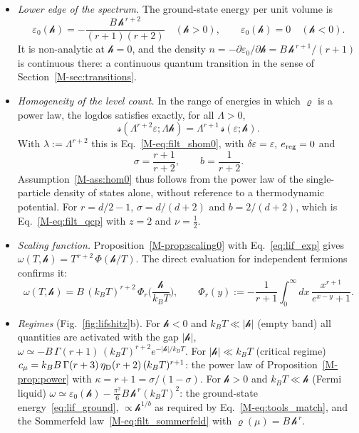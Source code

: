 \documentclass[10pt,a4paper]{article}
\theoremstyle{plain}
\theoremstyle{remark}
\newcommand{\lndos}{{logdos}}  %
\newcommand{\hfield}{\mathscr{h}}  %
\newcommand{\lds}{\mathscr{s}}  %
\newcommand{\etaD}{\eta_{\rm D}}  %
\begin{document}
\begin{itemize}\setlength{\itemsep}{0pt}
\item \emph{Lower edge of the spectrum.} The ground-state energy per unit
  volume is
  \begin{equation}\label{eq:lif_ground}
    \varepsilon_0(\hfield)=-\frac{B\,\hfield^{\,r+2}}{(r+1)(r+2)}\quad(\hfield>0) ,
    \qquad
    \varepsilon_0(\hfield)=0\quad(\hfield<0) .
  \end{equation}
  It is non-analytic at $\hfield=0$, and the density
  $n=-\partial\varepsilon_0/\partial\hfield=B\,\hfield^{\,r+1}/(r+1)$ is
  continuous there: a continuous quantum transition in the sense of
  Section~\ref{M-sec:transitions}.
\item \emph{Homogeneity of the level count.} In the range of energies in
  which $\varrho$ is a power law, the \lndos{} satisfies exactly, for all
  $\Lambda>0$,
  \begin{equation}\label{eq:lif_hom}
    \lds(\Lambda^{r+2}\varepsilon;\Lambda\hfield)=\Lambda^{r+1}\,\lds(\varepsilon;\hfield) .
  \end{equation}
  With $\lambda:=\Lambda^{r+2}$ this is Eq.~\eqref{M-eq:filt_shom0}, with
  $\delta\varepsilon=\varepsilon$, $e_{\rm reg}=0$ and
  \begin{equation}\label{eq:lif_exp}
    \sigma=\frac{r+1}{r+2} ,\qquad b=\frac{1}{r+2} .
  \end{equation}
  Assumption~\ref{M-ass:hom0} thus follows from the power law of the
  single-particle density of states alone, without reference to a
  thermodynamic potential. For $r=d/2-1$, $\sigma=d/(d+2)$ and $b=2/(d+2)$,
  which is Eq.~\eqref{M-eq:filt_qcp} with $z=2$ and $\nu=\tfrac12$.
\item \emph{Scaling function.} Proposition~\ref{M-prop:scaling0} with
  Eq.~\eqref{eq:lif_exp} gives
  $\omega(T,\hfield)=T^{\,r+2}\,\Phi(\hfield/T)$. The direct evaluation for
  independent fermions confirms it:
  \begin{equation}\label{eq:lif_omega}
    \omega(T,\hfield)=B\,(k_BT)^{r+2}\,\Phi_r\Big(\frac{\hfield}{k_BT}\Big) ,
    \qquad
    \Phi_r(y):=-\frac{1}{r+1}\int_0^{\infty}dx\,\frac{x^{r+1}}{e^{x-y}+1} .
  \end{equation}
\item \emph{Regimes} (Fig.~\ref{fig:lifshitz}b). For $\hfield<0$ and
  $k_BT\ll|\hfield|$ (empty band) all quantities are activated with the gap
  $|\hfield|$, $\omega\simeq-B\,\Gamma(r+1)\,(k_BT)^{r+2}e^{-|\hfield|/k_BT}$.
  For $|\hfield|\ll k_BT$ (critical regime)
  $c_\mu=k_BB\,\Gamma(r+3)\,\etaD(r+2)\,(k_BT)^{r+1}$: the power law of
  Proposition~\ref{M-prop:power} with $\kappa=r+1=\sigma/(1-\sigma)$. For
  $\hfield>0$ and $k_BT\ll\hfield$ (Fermi liquid)
  $\omega\simeq\varepsilon_0(\hfield)-\tfrac{\pi^{2}}{6}B\,\hfield^{\,r}(k_BT)^{2}$:
  the ground-state energy~\eqref{eq:lif_ground}, $\propto\hfield^{1/b}$ as
  required by Eq.~\eqref{M-eq:tools_match}, and the Sommerfeld
  law~\eqref{M-eq:filt_sommerfeld} with $\varrho(\mu)=B\,\hfield^{\,r}$.
\end{itemize}
\end{document}

